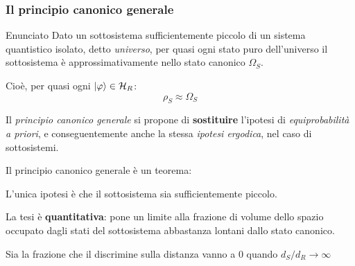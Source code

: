 \documentclass[10pt]{beamer}
\theoremstyle{definition}
\theoremstyle{plain}
\begin{document}
\begin{frame}
	\frametitle{Il principio canonico generale}
	
	\begin{block}{Enunciato}
		Dato un sottosistema sufficientemente piccolo di un sistema quantistico isolato, detto \textit{universo}, per quasi ogni stato puro dell'universo il sottosistema è approssimativamente nello stato canonico $\Omega_S$.
		
		\qquad Cioè, per quasi ogni $\ket{\varphi} \in \mathcal{H}_R$:
		\begin{equation*}
			\rho_S \approx \Omega_S
		\end{equation*}
		
	\end{block}

	Il \textit{principio canonico generale} si propone di \textbf{sostituire} l'ipotesi di \textit{equiprobabilità a priori}, e conseguentemente anche la stessa \textit{ipotesi ergodica}, nel caso di sottosistemi.
	\newline
	
	\pause
	
	Il principio canonico generale è un teorema:
	
	\pause
	\begin{description}[<+->]
		\item[Ipotesi] L'unica ipotesi è che il sottosistema sia sufficientemente piccolo.
		\item[Tesi] La tesi è \textbf{quantitativa}: pone un limite alla frazione di volume dello spazio occupato dagli stati del sottosistema abbastanza lontani dallo stato canonico.
	\end{description}
Sia la frazione che il discrimine sulla distanza vanno a $ 0 $ quando $ d_S / d_R \rightarrow \infty$
\end{frame}
\end{document}
